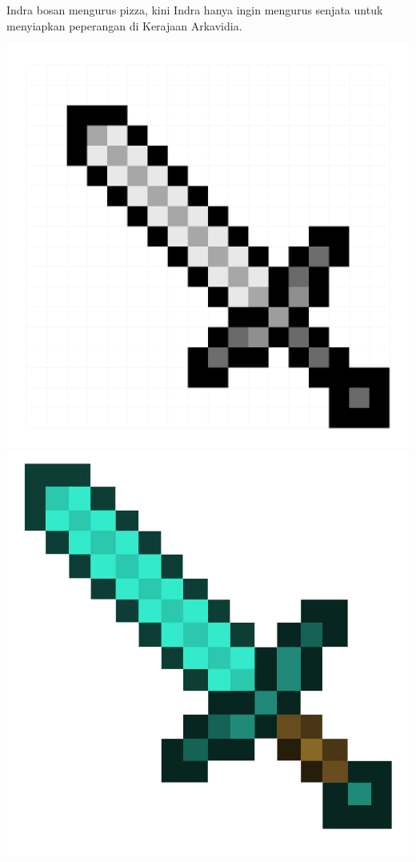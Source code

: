 \documentclass{article}
\begin{document}
Indra bosan mengurus pizza, kini Indra hanya ingin  mengurus senjata untuk menyiapkan peperangan di Kerajaan Arkavidia.
\begin{center}
\includegraphics[scale=0.05]{iron-sword.png}
\includegraphics[scale=0.09]{sword.jpg}

\end{center}
\end{document}
